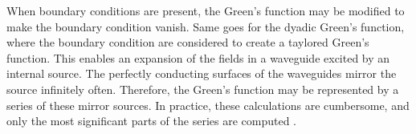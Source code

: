 When boundary conditions are present, the Green's function may be modified to make the boundary condition vanish. Same goes for the dyadic Green's function, where the boundary condition are considered to create a taylored Green's function. This enables an expansion of the fields in a waveguide excited by an internal source. The perfectly conducting surfaces of the waveguides mirror the source infinitely often. Therefore, the Green's function may be represented by a series of these mirror sources. In practice, these calculations are cumbersome, and only the most significant parts of the series are computed \cite{Collin_2015}. %




